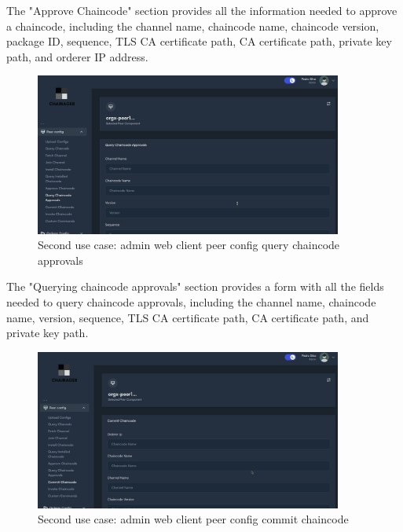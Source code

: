 The "Approve Chaincode" section provides all the information needed to approve a chaincode, including the channel name, chaincode name, chaincode version, package ID, sequence, TLS CA certificate path, CA certificate path, private key path, and orderer IP address.

\begin{figure}[H]
    \centering
    \includegraphics[width=0.9\textwidth]{assets/use-case-2/peer-config-query-chaincode-approvals.png} %
    \caption{Second use case: admin web client peer config query chaincode approvals}
    \label{fig:sample-image} 
\end{figure}

The "Querying chaincode approvals" section provides a form with all the fields needed to query chaincode approvals, including the channel name, chaincode name, version, sequence, TLS CA certificate path, CA certificate path, and private key path.

\begin{figure}[H]
    \centering
    \includegraphics[width=0.9\textwidth]{assets/use-case-2/peer-config-commit-chaincode.png} %
    \caption{Second use case: admin web client peer config commit chaincode}
    \label{fig:sample-image} 
\end{figure}

